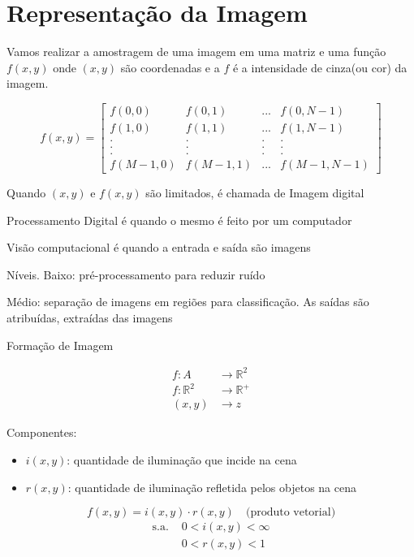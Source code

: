 \documentclass[a4paper,12pt]{report}
\begin{document}
	\section{Representação da Imagem}
	Vamos realizar a amostragem de uma imagem em uma matriz e uma função $f(x,y)$ onde $(x,y)$ são coordenadas e a $f$ é a intensidade de cinza(ou cor) da imagem.
	
	\begin{equation}
		f(x,y) = 
		\begin{bmatrix}
			f(0,0) & f(0,1) & ... & f(0, N-1) \\
			f(1,0) & f(1,1) & ... & f(1, N-1) \\
			. & . & . & . \\
			. & . & . & . \\
			. & . & . & . \\
			f(M-1, 0) & f(M-1, 1) & ... & f(M-1, N-1)
		\end{bmatrix}
	\end{equation}
	
	
	Quando $(x,y)$ e $f(x,y)$ são limitados, é chamada de Imagem digital
	
	Processamento Digital é quando o mesmo é feito por um computador
	
	Visão computacional é quando a entrada e saída são imagens
	
	Níveis. Baixo: pré-processamento para reduzir ruído
	
	Médio: separação de imagens em regiões para classificação. As saídas são atribuídas, extraídas das imagens
	
	Formação de Imagem
	
	\begin{align*}
		f: A &\to \mathbb{R}^2 \\
		f: \mathbb{R}^2 &\to \mathbb{R}^+ \\
		(x,y) &\to z
	\end{align*}
	
	Componentes:
	\begin{itemize}
		\item $i(x,y)$: quantidade de iluminação que incide na cena
		\item $r(x,y)$: quantidade de iluminação refletida pelos objetos na cena
	\end{itemize}
	
	$$f(x, y) = i(x,y) \cdot r(x,y) \quad \text{(produto vetorial)}$$
	\begin{align*}
		\text{s.a. } & 0 < i(x,y) < \infty \\
		& 0 < r(x,y) < 1
	\end{align*}
	
\end{document}
